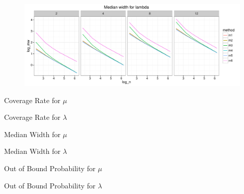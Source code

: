\documentclass[12pt]{article}
\begin{document}
\begin{figure}[h] 
\includegraphics[width=1.1\textwidth]{results4.pdf}
\caption{}
\end{figure}


\begin{table}[h]
\caption{Coverage Rate for $\mu$}
\end{table}

\begin{table}[h]
\caption{Coverage Rate for $\lambda$}
\end{table}

\begin{table}[h]
\caption{Median Width for $\mu$}
\end{table}

\begin{table}[h]
\caption{Median Width for $\lambda$}
\end{table}

\begin{table}[h]
\caption{Out of Bound Probability for $\mu$}
\end{table}

\begin{table}[h]
\caption{Out of Bound Probability for $\lambda$}
\end{table}
\end{document}
